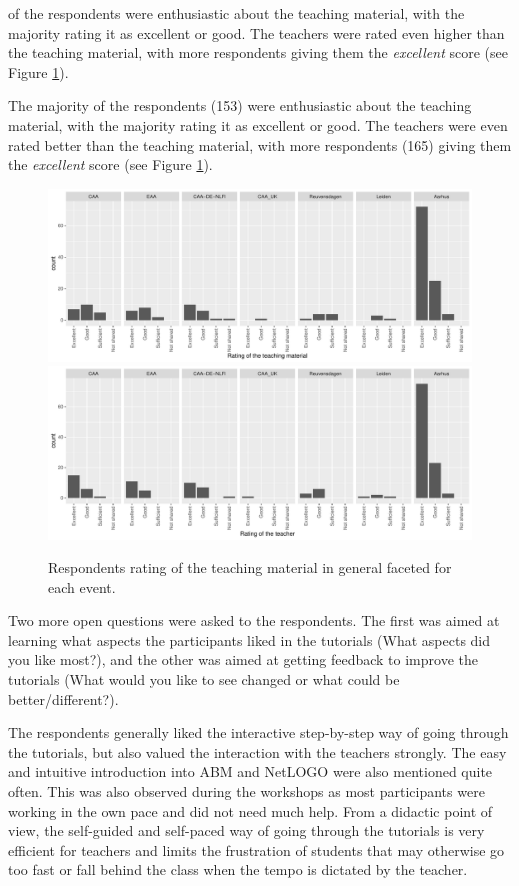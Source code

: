\documentclass[
]{article}
\begin{document}
of the respondents were enthusiastic about the teaching material, with the majority rating it as excellent or good. The teachers were rated even higher than the teaching material, with more respondents giving them the \emph{excellent} score (see Figure \ref{fig:rating-teaching}).

The majority of the respondents (153) were enthusiastic about the teaching material, with the majority rating it as excellent or good. The teachers were even rated better than the teaching material, with more respondents (165) giving them the \emph{excellent} score (see Figure \ref{fig:rating-teaching}).

\begin{figure}
\includegraphics[height=0.5\textheight]{paper_files/figure-latex/rating-teaching-1} \includegraphics[height=0.5\textheight]{paper_files/figure-latex/rating-teaching-2} \caption{Respondents rating of the teaching material in general faceted for each event.}\label{fig:rating-teaching}
\end{figure}

Two more open questions were asked to the respondents. The first was aimed at learning what aspects the participants liked in the tutorials (What aspects did you like most?), and the other was aimed at getting feedback to improve the tutorials (What would you like to see changed or what could be better/different?).

The respondents generally liked the interactive step-by-step way of going through the tutorials, but also valued the interaction with the teachers strongly. The easy and intuitive introduction into ABM and NetLOGO were also mentioned quite often. This was also observed during the workshops as most participants were working in the own pace and did not need much help. From a didactic point of view, the self-guided and self-paced way of going through the tutorials is very efficient for teachers and limits the frustration of students that may otherwise go too fast or fall behind the class when the tempo is dictated by the teacher.
\end{document}
